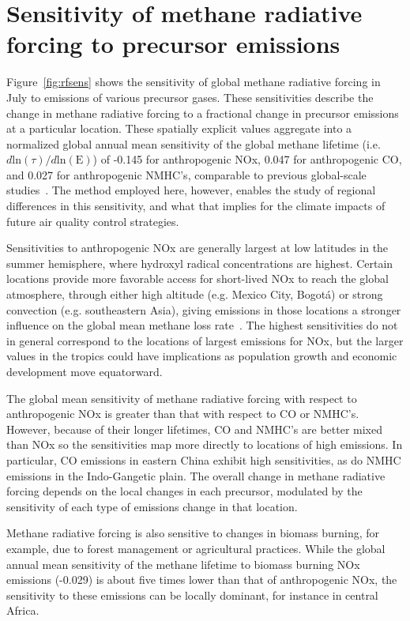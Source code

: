 \section{Sensitivity of methane radiative forcing to precursor emissions}

Figure~\ref{fig:rfsens} shows the sensitivity of global methane radiative forcing in July to emissions of various precursor gases. These sensitivities describe the change in methane radiative forcing to a fractional change in precursor emissions at a particular location. These spatially explicit values aggregate into a normalized global annual mean sensitivity of the global methane lifetime (i.e. $d \mathrm{ln}(\tau)/d\mathrm{ln}(\mathrm{E})$) of -0.145 for anthropogenic NOx, 0.047 for anthropogenic CO, and 0.027 for anthropogenic NMHC's, comparable to previous global-scale studies~\citep{ref:fry2012,ref:holmes2013}. The method employed here, however, enables the study of regional differences in this sensitivity, and what that implies for the climate impacts of future air quality control strategies.


Sensitivities to anthropogenic NOx are generally largest at low latitudes in the summer hemisphere, where hydroxyl radical concentrations are highest. Certain locations provide more favorable access for short-lived NOx to reach the global atmosphere, through either high altitude (e.g. Mexico City, Bogot\'a) or strong convection (e.g. southeastern Asia), giving emissions in those locations a stronger influence on the global mean methane loss rate~\citep{ref:bowman2012}. The highest sensitivities do not in general correspond to the locations of largest emissions for NOx, but the larger values in the tropics could have implications as population growth and economic development move equatorward.

The global mean sensitivity of methane radiative forcing with respect to anthropogenic NOx is greater than that with respect to CO or NMHC's. However, because of their longer lifetimes, CO and NMHC's are better mixed than NOx so the sensitivities map more directly to locations of high emissions. In particular, CO emissions in eastern China exhibit high sensitivities, as do NMHC emissions in the Indo-Gangetic plain. The overall change in methane radiative forcing depends on the local changes in each precursor, modulated by the sensitivity of each type of emissions change in that location.

Methane radiative forcing is also sensitive to changes in biomass burning, for example, due to forest management or agricultural practices. While the global annual mean sensitivity of the methane lifetime to biomass burning NOx emissions (-0.029) is about five times lower than that of anthropogenic NOx, the sensitivity to these emissions can be locally dominant, for instance in central Africa.
